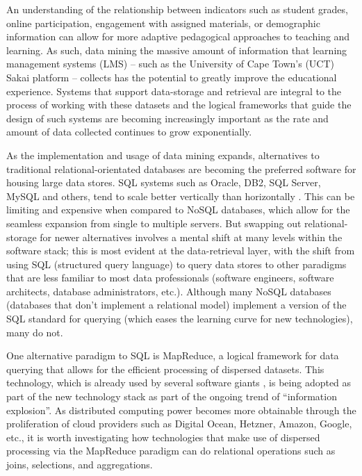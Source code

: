 An understanding of the relationship between indicators such as student grades, online participation, engagement with assigned materials, or demographic information can allow for more adaptive pedagogical approaches to teaching and learning. As such, data mining the massive amount of information that learning management systems (LMS) – such as the University of Cape Town's (UCT) Sakai platform \cite{sakai} – collects has the potential to greatly improve the educational experience. Systems that support data-storage and retrieval are integral to the process of working with these datasets and the logical frameworks that guide the design of such systems are becoming increasingly important as the rate and amount of data collected continues to grow exponentially.

As the implementation and usage of data mining expands, alternatives to traditional relational-orientated databases are becoming the preferred software for housing large data stores. SQL systems such as Oracle, DB2, SQL Server, MySQL and others, tend to scale better vertically than horizontally \cite{couchbaseWhitePaper}. This can be limiting and expensive when compared to NoSQL databases, which allow for the seamless expansion from single to multiple servers.  But swapping out relational-storage for newer alternatives involves a mental shift at many levels within the software stack; this is most evident at the data-retrieval layer, with the shift from using SQL (structured query language) to query data stores to other paradigms that are less familiar to most data professionals (software engineers, software architects, database administrators, etc.). Although many NoSQL databases (databases that don't implement a relational model) implement a version of the SQL standard for querying (which eases the learning curve for new technologies), many do not.

One alternative paradigm to SQL is MapReduce, a logical framework for data querying that allows for the efficient processing of dispersed datasets. This technology, which is already used by several software giants \cite{chandar2010}, is being adopted as part of the new technology stack as part of the ongoing trend of ``information explosion''. As distributed computing power becomes more obtainable through the proliferation of cloud providers such as Digital Ocean, Hetzner, Amazon, Google, etc., it is worth investigating how technologies that make use of dispersed processing via the MapReduce paradigm can do relational operations such as joins, selections, and aggregations.

